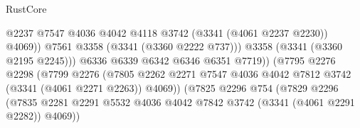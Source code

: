 \begin{lexlean}{RustCore}
\begin{coremodule}
                                                  @2237
                                                  @7547
                                                  @4036
                                                  @4042
                                                  @4118
                                                  @3742
                                                  (@3341 (@4061 @2237 @2230))
                                                  @4069))
                                              @7561
                                              @3358
                                              (@3341 (@3360 @2222 @737)))
                                            @3358
                                            (@3341 (@3360 @2195 @2245)))
                                          @6336
                                          @6339
                                          @6342
                                          @6346
                                          @6351
                                          @7719))
                                      (@7795
                                        @2276
                                        @2298
                                        (@7799
                                          @2276
                                          (@7805
                                            @2262
                                            @2271
                                            @7547
                                            @4036
                                            @4042
                                            @7812
                                            @3742
                                            (@3341 (@4061 @2271 @2263))
                                            @4069))
                                        (@7825
                                          @2296
                                          @754
                                          (@7829
                                            @2296
                                            (@7835
                                              @2281
                                              @2291
                                              @5532
                                              @4036
                                              @4042
                                              @7842
                                              @3742
                                              (@3341 (@4061 @2291 @2282))
                                              @4069))

\end{coremodule}
\end{lexlean}
